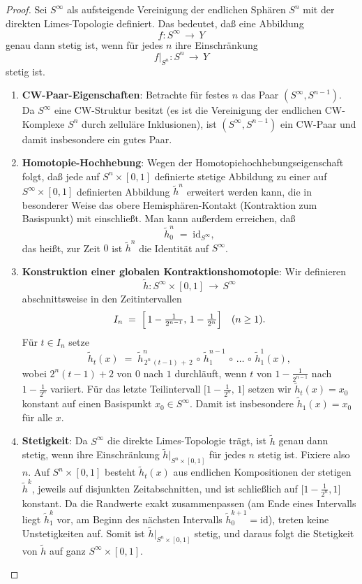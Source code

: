 \documentclass[12pt]{article}
\numberwithin{conj}{section}
\begin{document}
    \begin{proof}
    Sei \(S^\infty\) als aufsteigende Vereinigung der endlichen Sphären \(S^n\) mit der direkten Limes-Topologie definiert. Das bedeutet, daß eine Abbildung
    \[
    f \colon S^\infty \,\longrightarrow\, Y
    \]
    genau dann stetig ist, wenn für jedes \(n\) ihre Einschränkung
    \[
    f\vert_{S^n} \colon S^n \,\longrightarrow\, Y
    \]
    stetig ist. 

    \begin{enumerate}
        \item \textbf{CW-Paar-Eigenschaften}: Betrachte für festes \(n\) das Paar \((S^\infty, S^{n-1})\). Da \(S^\infty\) eine CW-Struktur besitzt (es ist die Vereinigung der endlichen CW-Komplexe \(S^n\) durch zelluläre Inklusionen), ist \((S^\infty, S^{n-1})\) ein CW-Paar und damit insbesondere ein gutes Paar.
        \item \textbf{Homotopie-Hochhebung}: Wegen der Homotopiehochhebungseigenschaft folgt, daß jede auf \(S^n \times [0,1]\) definierte stetige Abbildung zu einer auf \(S^\infty \times [0,1]\) definierten Abbildung \(\tilde{h}^n\) erweitert werden kann, die in besonderer Weise das obere Hemisphären-Kontakt (Kontraktion zum Basispunkt) mit einschließt. Man kann außerdem erreichen, daß
        \[
        \tilde{h}^n_0 \;=\;\mathrm{id}_{S^\infty},
        \]
        das heißt, zur Zeit \(0\) ist \(\tilde{h}^n\) die Identität auf \(S^\infty\).
        \item \textbf{Konstruktion einer globalen Kontraktionshomotopie}: Wir definieren
        \[
        \tilde{h} \colon S^\infty \times [0,1] \,\longrightarrow\, S^\infty
        \]
        abschnittsweise in den Zeitintervallen
        \[
        I_n \;=\;\Bigl[\,1 - \tfrac{1}{2^{n-1}},\,1 - \tfrac{1}{2^n}\Bigr]
        \quad
        (n \ge 1).
        \]
        Für \(t \in I_n\) setze
        \[
        \tilde{h}_t(x)
        \;=\;
        \tilde{h}^n_{\,2^n\,(t-1)\,+\,2}\,\circ\,\tilde{h}^{n-1}_1\,\circ\,\dots\,\circ\,\tilde{h}^1_1(x),
        \]
        wobei \(2^n(t-1)+2\) von \(0\) nach \(1\) durchläuft, wenn \(t\) von \(1 - \tfrac{1}{2^{n-1}}\) nach \(1 - \tfrac{1}{2^n}\) variiert. Für das letzte Teilintervall \(\bigl[1 - \tfrac{1}{2^n},\,1\bigr]\) setzen wir \(\tilde{h}_t(x)=x_0\) konstant auf einen Basispunkt \(x_0\in S^\infty\). Damit ist insbesondere \(\tilde{h}_1(x)=x_0\) für alle \(x\).
        \item \textbf{Stetigkeit}: Da \(S^\infty\) die direkte Limes-Topologie trägt, ist \(\tilde{h}\) genau dann stetig, wenn ihre Einschränkung \(\tilde{h}\vert_{S^n \times [0,1]}\) für jedes \(n\) stetig ist. Fixiere also \(n\). Auf \(S^n \times [0,1]\) besteht \(\tilde{h}_t(x)\) aus endlichen Kompositionen der stetigen \(\tilde{h}^k\), jeweils auf disjunkten Zeitabschnitten, und ist schließlich auf \(\bigl[1 - \tfrac{1}{2^n},1\bigr]\) konstant. Da die Randwerte exakt zusammenpassen (am Ende eines Intervalls liegt \(\tilde{h}^k_1\) vor, am Beginn des nächsten Intervalls \(\tilde{h}^{k+1}_0 = \mathrm{id}\)), treten keine Unstetigkeiten auf. Somit ist \(\tilde{h}\vert_{S^n \times [0,1]}\) stetig, und daraus folgt die Stetigkeit von \(\tilde{h}\) auf ganz \(S^\infty \times [0,1]\). 

\end{enumerate}
\end{proof}
\end{document}
